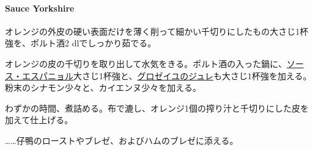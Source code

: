 \begin{recette}
\hypertarget{sauce-yorkshire}{%
\paragraph{Sauce Yorkshire}\label{sauce-yorkshire}}


オレンジの外皮の硬い表面だけを薄く削って細かい千切りにしたもの大さじ1杯強を、ポルト酒2
dlでしっかり茹でる。

オレンジの皮の千切りを取り出して水気をきる。ポルト酒の入った鍋に、\protect\hyperlink{sauce-espagnole}{ソース・エスパニョル}大さじ1杯強と、\protect\hyperlink{}{グロゼイユのジュレ}も大さじ1杯強を加える。粉末のシナモン少々と、カイエンヌ少々を加える。

わずかの時間、煮詰める。布で漉し、オレンジ1個の搾り汁と千切りにした皮を加えて仕上げる。

\ldots{}\ldots{}仔鴨のローストやブレゼ、およびハムのブレゼに添える。
\end{recette}